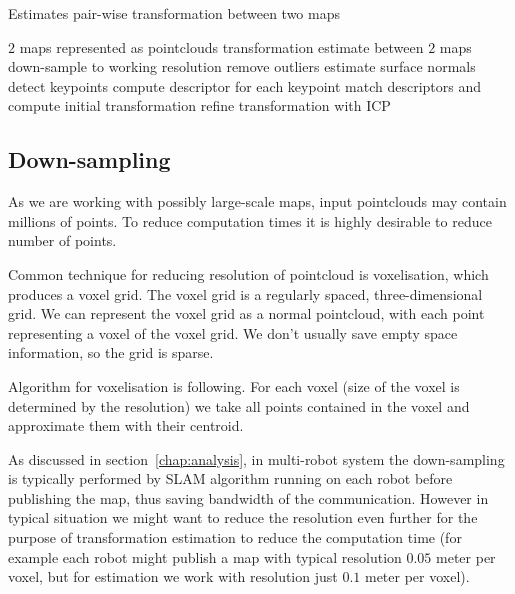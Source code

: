 \begin{algorithm}
    \caption[Pair-wise transformation estimation]{Estimates pair-wise transformation between two maps}
    \label{alg:estimate-pair}
    \begin{algorithmic}[1]
        \Require $2$ maps represented as pointclouds
        \Ensure transformation estimate between $2$ maps
            \State down-sample to working resolution
            \State remove outliers
            \State estimate surface normals
            \State detect keypoints
            \State compute descriptor for each keypoint
            \State match descriptors and compute initial transformation
            \State refine transformation with \gls{ICP}
        \EndProcedure
    \end{algorithmic}
\end{algorithm}

\subsection{Down-sampling}
\label{sec:downsampling}

As we are working with possibly large-scale maps, input pointclouds may contain millions of points. To reduce computation times it is highly desirable to reduce number of points.

Common technique for reducing resolution of pointcloud is voxelisation, which produces a voxel grid. The voxel grid is a regularly spaced, three-dimensional grid. We can represent the voxel grid as a normal pointcloud, with each point representing a voxel of the voxel grid. We don't usually save empty space information, so the grid is sparse.

Algorithm for voxelisation is following. For each voxel (size of the voxel is determined by the resolution) we take all points contained in the voxel and approximate them with their centroid.

As discussed in section~\ref{chap:analysis}, in multi-robot system the down-sampling is typically performed by \gls{SLAM} algorithm running on each robot before publishing the map, thus saving bandwidth of the communication. However in typical situation we might want to reduce the resolution even further for the purpose of transformation estimation to reduce the computation time (for example each robot might publish a map with typical resolution $0.05$ meter per voxel, but for estimation we work with resolution just $0.1$ meter per voxel).

